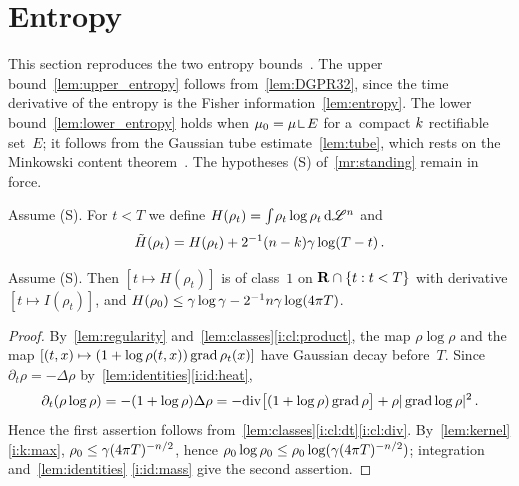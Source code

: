 \documentclass[a4paper,twoside,leqno]{article}
\begin{document}
\section{Entropy}
\label{sec:entropy}

\begin{miniremark}
    \label{mr:sec_entropy}
    This section reproduces the two entropy bounds~\cite[(4.1), (4.2)]
    {DePhilippisGennaioliPigatiRindler2026}. The upper bound~\ref{lem:upper_entropy} follows
    from~\ref{lem:DGPR32}, since the time derivative of the entropy is the Fisher
    information~\ref{lem:entropy}. The lower bound~\ref{lem:lower_entropy} holds when $\mu_0 = \mu
    \restrict E$ for a~compact $k$ rectifiable set~$E$; it follows from the Gaussian tube
    estimate~\ref{lem:tube}, which rests on the Minkowski content
    theorem~\cite[3.2.39]{Federer1969}. The hypotheses (S) of~\ref{mr:standing} remain in force.
\end{miniremark}

\begin{definition}
    \label{def:entropy}
    Assume (S). For $t < T$ we define $H(\rho_t) = {\textstyle\int_{}^{}} \rho_t \log \rho_t \,\mathrm{d}
    \mathscr{L}^{n}$ and
    \begin{displaymath}
        \tilde H(\rho_t) = H(\rho_t) + 2^{-1} (n - k) \gamma \log(T-t) \,.
    \end{displaymath}
\end{definition}

\begin{lemma}
    \label{lem:entropy}
    Assume (S). Then $[t \mapsto H(\rho_t)]$ is of class~$1$ on $\mathbf{R} \cap \{ t : t < T \}$ with
    derivative $[t \mapsto I(\rho_t)]$, and $H(\rho_0) \le \gamma \log \gamma - 2^{-1} n
    \gamma \log(4 \pi T)$.
\end{lemma}

\begin{proof}
    By~\ref{lem:regularity} and~\ref{lem:classes}\ref{i:cl:product}, the map $\rho \log \rho$ and
    the map $[(t,x) \mapsto (1 + \log \rho(t,x)) \operatorname{grad} \rho_t(x)]$ have Gaussian decay
    before~$T$. Since $\partial_t \rho = - \Delta \rho$ by~\ref{lem:identities}\ref{i:id:heat},
    \begin{displaymath}
        \partial_t (\rho \log \rho) = - (1 + \log \rho) \Delta \rho = - \mathrm{div}\bigl[ (1 +
        \log \rho) \operatorname{grad} \rho \bigr] + \rho |\operatorname{grad} \log \rho|^2 \,.
    \end{displaymath}
    Hence the first assertion follows from~\ref{lem:classes}\ref{i:cl:dt}\ref{i:cl:div}.
    By~\ref{lem:kernel}\ref{i:k:max}, $\rho_0 \le \gamma (4 \pi T)^{-n/2}$, hence $\rho_0 \log
    \rho_0 \le \rho_0 \log(\gamma (4 \pi T)^{-n/2})$; integration and~\ref{lem:identities}
    \ref{i:id:mass} give the second assertion.
\end{proof}
\end{document}
